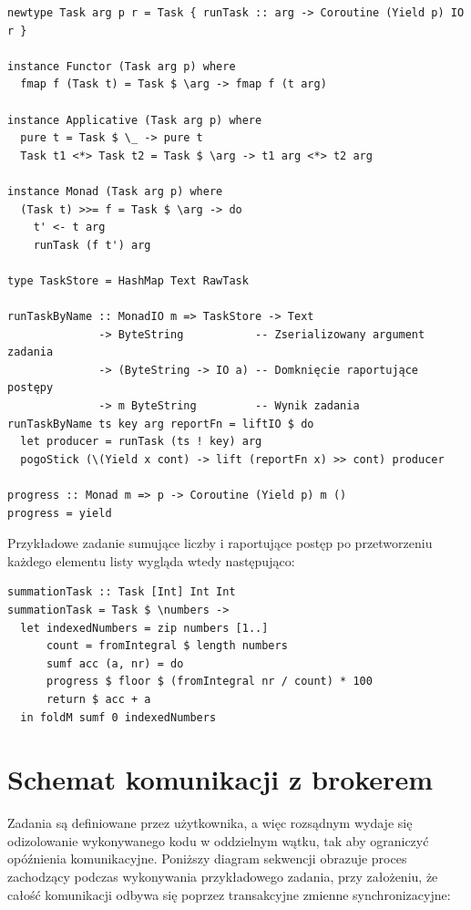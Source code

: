 \begin{lstlisting}[caption=Ostateczna implementacja zadania]
newtype Task arg p r = Task { runTask :: arg -> Coroutine (Yield p) IO r }
  
instance Functor (Task arg p) where
  fmap f (Task t) = Task $ \arg -> fmap f (t arg)
  
instance Applicative (Task arg p) where
  pure t = Task $ \_ -> pure t
  Task t1 <*> Task t2 = Task $ \arg -> t1 arg <*> t2 arg
  
instance Monad (Task arg p) where
  (Task t) >>= f = Task $ \arg -> do
    t' <- t arg
    runTask (f t') arg 
  
type TaskStore = HashMap Text RawTask

runTaskByName :: MonadIO m => TaskStore -> Text 
              -> ByteString           -- Zserializowany argument zadania
              -> (ByteString -> IO a) -- Domknięcie raportujące postępy
              -> m ByteString         -- Wynik zadania
runTaskByName ts key arg reportFn = liftIO $ do
  let producer = runTask (ts ! key) arg
  pogoStick (\(Yield x cont) -> lift (reportFn x) >> cont) producer

progress :: Monad m => p -> Coroutine (Yield p) m ()
progress = yield
\end{lstlisting}

Przykładowe zadanie sumujące liczby i raportujące postęp po przetworzeniu każdego elementu listy wygląda wtedy następująco:
\begin{lstlisting}
summationTask :: Task [Int] Int Int
summationTask = Task $ \numbers -> 
  let indexedNumbers = zip numbers [1..]
      count = fromIntegral $ length numbers
      sumf acc (a, nr) = do
      progress $ floor $ (fromIntegral nr / count) * 100
      return $ acc + a
  in foldM sumf 0 indexedNumbers
\end{lstlisting}

\section{Schemat komunikacji z brokerem}
Zadania są definiowane przez użytkownika, a więc rozsądnym wydaje się odizolowanie wykonywanego kodu w oddzielnym wątku, tak aby ograniczyć opóźnienia komunikacyjne. Poniższy diagram sekwencji obrazuje proces zachodzący podczas wykonywania przykładowego zadania, przy założeniu, że całość komunikacji odbywa się poprzez transakcyjne zmienne synchronizacyjne\cite{Stm}:

